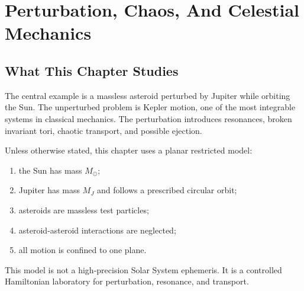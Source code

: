 \chapter{Perturbation, Chaos, And Celestial Mechanics}
\label{chap:perturbation-chaos}

\section{What This Chapter Studies}
\label{sec:perturbation-chapter-purpose}

The central example is a massless asteroid perturbed by Jupiter while orbiting
the Sun. The unperturbed problem is Kepler motion, one of the most integrable
systems in classical mechanics. The perturbation introduces resonances, broken
invariant tori, chaotic transport, and possible ejection.

\begin{assumption}
Unless otherwise stated, this chapter uses a planar restricted model:
\begin{enumerate}
\item the Sun has mass \(M_\odot\);
\item Jupiter has mass \(M_J\) and follows a prescribed circular orbit;
\item asteroids are massless test particles;
\item asteroid-asteroid interactions are neglected;
\item all motion is confined to one plane.
\end{enumerate}
This model is not a high-precision Solar System ephemeris. It is a controlled
Hamiltonian laboratory for perturbation, resonance, and transport.
\end{assumption}

